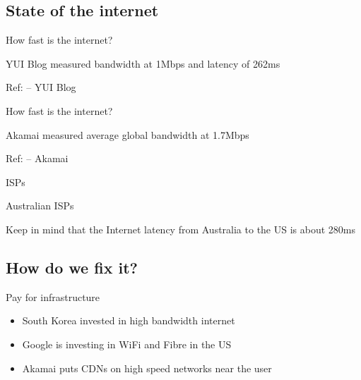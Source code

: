 \documentclass{beamer}
\begin{document}
\subsection{State of the internet}

\begin{frame}{How fast is the internet?}
  \begin{center}
  YUI Blog measured bandwidth at 1Mbps and latency of 262ms
  \end{center}
  \parbox[c][0.9\paperheight]{\paperwidth}{ }
  \hfill \tiny{Ref: \href{http://www.yuiblog.com/blog/2010/04/08/analyzing-bandwidth-and-latency/}{} -- YUI Blog}
\end{frame}

\begin{frame}{How fast is the internet?}
  \begin{center}
  Akamai measured average global bandwidth at 1.7Mbps
  \end{center}
  \vfill
  \tiny{Ref: \href{http://www.akamai.com/stateoftheinternet/}{} -- Akamai}
\end{frame}

\begin{frame}{ISPs}
\end{frame}

\begin{frame}{Australian ISPs}
  \parbox[c][1.2\paperheight]{\paperwidth} { }
  \tiny{Keep in mind that the Internet latency from Australia to the US is about 280ms}
\end{frame}

\subsection{How do we fix it?}

\begin{frame}{Pay for infrastructure}
  \begin{itemize}
  \item South Korea invested in high bandwidth internet
  \item Google is investing in WiFi and Fibre in the US
  \item Akamai puts CDNs on high speed networks near the user
  \end{itemize}
\end{frame}
\end{document}
